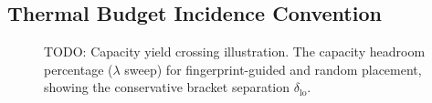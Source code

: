 \subsection{Thermal Budget Incidence Convention}

\begin{figure}[t]
\centering
\caption{TODO: Capacity yield crossing illustration. The capacity headroom
percentage ($\lambda$ sweep) for fingerprint-guided and random placement,
showing the conservative bracket separation $\delta_{\mathrm{lo}}$.}
\label{fig:model}
\end{figure}
